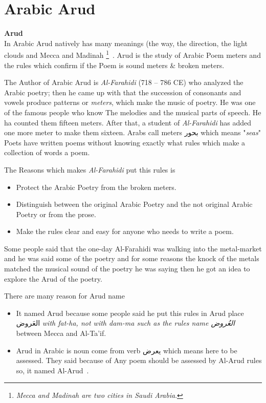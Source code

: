 \section{Arabic Arud}
 


\begin{definition}\label{def:arud}
  \textbf{Arud} \hfill \\
  In Arabic Arud natively has many meanings (the way, the direction, the light clouds and Mecca and Madinah \footnote{\textit{Mecca and Madinah are two cities in  Saudi Arabia}.}~\cite{AlQuaed}. Arud is the study of Arabic Poem meters and the rules which confirm if the Poem is sound meters \& broken meters.
\end{definition}
 
The Author of Arabic Arud  is \textit{Al-Farahidi} (718 – 786 CE) who analyzed the Arabic poetry; then he came up with that the succession of consonants and vowels produce patterns or \textit{meters}, which make the music of poetry. He was one of the famous people who know The melodies and the musical parts of speech. He ha counted them fifteen meters.  After that, a student of \textit{Al-Farahidi} has added one more meter to make them sixteen. Arabs call meters \textarabic{بحور} which means "\textit{seas}" Poets have written poems without knowing exactly what rules which make a collection of words a poem.

The Reasons which makes \textit{Al-Farahidi} put this rules is

  \begin{itemize}
  \item Protect the Arabic Poetry from the broken meters.
  \item Distinguish between the original Arabic Poetry and the not original Arabic Poetry or from the prose.
    \item Make the rules clear and easy for anyone who needs to write a poem.
  \end{itemize}

  Some people said that the one-day Al-Farahidi was walking into the metal-market and he was said some of the poetry and for some reasons the knock of the metals matched the musical sound of the poetry he was saying then he got an idea to explore the Arud of the poetry.

 There are many reason for Arud name 
  \begin{itemize}
  \item It named Arud because some people said he put this rules in Arud place \textarabic{العَروض} \textit{with fat-ha, not with dam-ma such as the rules name \textarabic{العُروض} } between Mecca and Al-Ta'if\cite{AlQuaed}.
  \item Arud in Arabic is noun come from verb \textarabic{يعرض} which means here to be assessed. They said because of Any poem should be assessed by Al-Arud rules so, it named Al-Arud~\cite{Alkafi1994}.
  \end{itemize}
  
